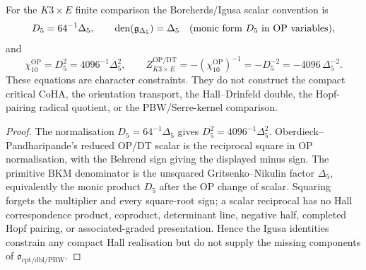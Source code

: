 \begin{corollary}
\label{cor:k3e-igusa-scalar-compact-hall-obstruction}
For the $K3\times E$ finite comparison the Borcherds/Igusa scalar convention is
\[
 D_5=64^{-1}\Delta_5,\qquad
 \operatorname{den}(\mathfrak g_{\Delta_5})=\Delta_5
 \quad
 \textup{(monic form }D_5\textup{ in OP variables),}
\]
and
\[
 \chi_{10}^{\mathrm{OP}}
 =
 D_5^2
 =
 4096^{-1}\Delta_5^2,
 \qquad
 Z^{\mathrm{OP/DT}}_{K3\times E}
 =
 -(\chi_{10}^{\mathrm{OP}})^{-1}
 =
 -D_5^{-2}
 =
 -4096\,\Delta_5^{-2}.
\]
These equations are character constraints. They do not construct the
compact critical CoHA, the orientation transport, the Hall--Drinfeld
double, the Hopf-pairing radical quotient, or the
PBW/Serre-kernel comparison.
\end{corollary}

\begin{proof}
The normalisation $D_5=64^{-1}\Delta_5$ gives
$D_5^2=4096^{-1}\Delta_5^2$. Oberdieck--Pandharipande's reduced
OP/DT scalar is the reciprocal square in OP normalisation, with the
Behrend sign giving the displayed minus sign. The primitive BKM
denominator is the unsquared Gritsenko--Nikulin factor $\Delta_5$,
equivalently the monic product $D_5$ after the OP change of scalar.
Squaring forgets the multiplier and every square-root sign; a scalar
reciprocal has no Hall correspondence product, coproduct, determinant
line, negative half, completed Hopf pairing, or associated-graded
presentation. Hence the Igusa identities constrain any compact Hall
realisation but do not supply the missing components of
$\mathfrak o_{\mathrm{cpt/dbl/PBW}}$.
\end{proof}

